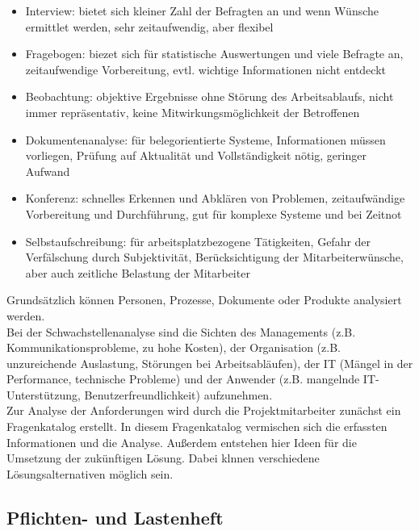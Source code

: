 \documentclass[a4paper, 12pt]{report}
\begin{document}
\begin{itemize}
    \item Interview: bietet sich kleiner Zahl der Befragten an und wenn Wünsche
        ermittlet werden, sehr zeitaufwendig, aber flexibel
    \item Fragebogen: biezet sich für statistische Auswertungen und viele 
        Befragte an, zeitaufwendige Vorbereitung, evtl. wichtige Informationen 
        nicht entdeckt
    \item Beobachtung: objektive Ergebnisse ohne Störung des Arbeitsablaufs, 
        nicht immer repräsentativ, keine Mitwirkungsmöglichkeit der Betroffenen
    \item Dokumentenanalyse: für belegorientierte Systeme, Informationen müssen 
        vorliegen, Prüfung auf Aktualität und Vollständigkeit nötig, geringer 
        Aufwand
    \item Konferenz: schnelles Erkennen und Abklären von Problemen, 
        zeitaufwändige Vorbereitung und Durchführung, gut für komplexe Systeme 
        und bei Zeitnot
    \item Selbstaufschreibung: für arbeitsplatzbezogene Tätigkeiten, Gefahr der
        Verfälschung durch Subjektivität, Berücksichtigung der 
        Mitarbeiterwünsche, aber auch zeitliche Belastung der Mitarbeiter
\end{itemize}

Grundsätzlich können Personen, Prozesse, Dokumente oder Produkte analysiert 
werden. \\

Bei der Schwachstellenanalyse sind die Sichten des Managements (z.B. 
Kommunikationsprobleme, zu hohe Kosten), der Organisation (z.B. unzureichende 
Auslastung, Störungen bei Arbeitsabläufen), der IT (Mängel in der Performance, 
technische Probleme) und der Anwender (z.B. mangelnde IT-Unterstützung, 
Benutzerfreundlichkeit) aufzunehmen. \\

Zur Analyse der Anforderungen wird durch die Projektmitarbeiter zunächst ein 
Fragenkatalog erstellt. In diesem Fragenkatalog vermischen sich die erfassten 
Informationen und die Analyse. Außerdem entstehen hier Ideen für die Umsetzung 
der zukünftigen Lösung. Dabei klnnen verschiedene Lösungsalternativen möglich 
sein. \\

\subsection{Pflichten- und Lastenheft}
\end{document}
